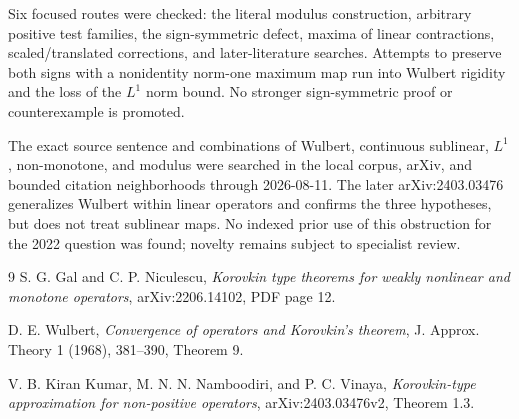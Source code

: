 \documentclass[11pt]{article}
\begin{document}
Six focused routes were checked: the literal modulus construction, arbitrary
positive test families, the sign-symmetric defect, maxima of linear
contractions, scaled/translated corrections, and later-literature searches.
Attempts to preserve both signs with a nonidentity norm-one maximum map run
into Wulbert rigidity and the loss of the $L^1$ norm bound.  No stronger
sign-symmetric proof or counterexample is promoted.

The exact source sentence and combinations of Wulbert, continuous sublinear,
$L^1$, non-monotone, and modulus were searched in the local corpus, arXiv, and
bounded citation neighborhoods through 2026-08-11.  The later
arXiv:2403.03476 generalizes Wulbert within linear operators and confirms the
three hypotheses, but does not treat sublinear maps.  No indexed prior use of
this obstruction for the 2022 question was found; novelty remains subject to
specialist review.

\begin{thebibliography}{9}
S. G. Gal and C. P. Niculescu,
\emph{Korovkin type theorems for weakly nonlinear and monotone operators},
arXiv:2206.14102, PDF page 12.

D. E. Wulbert,
\emph{Convergence of operators and Korovkin's theorem},
J. Approx. Theory 1 (1968), 381--390, Theorem 9.

V. B. Kiran Kumar, M. N. N. Namboodiri, and P. C. Vinaya,
\emph{Korovkin-type approximation for non-positive operators},
arXiv:2403.03476v2, Theorem 1.3.
\end{thebibliography}
\end{document}
